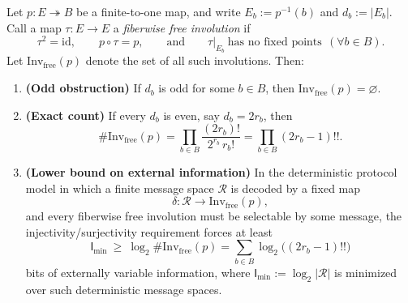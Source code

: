\begin{theorem}\label{thm:fiberwise-free-involution-matching-entropy}
Let \(p:E\twoheadrightarrow B\) be a finite-to-one map, and write \(E_b:=p^{-1}(b)\) and \(d_b:=|E_b|\).
Call a map \(\tau:E\to E\) a \emph{fiberwise free involution} if
\[
\tau^2=\mathrm{id},\qquad p\circ\tau=p,\qquad \text{and}\qquad \tau|_{E_b}\ \text{has no fixed points}\ \ (\forall b\in B).
\]
Let \(\mathrm{Inv}_{\mathrm{free}}(p)\) denote the set of all such involutions.
Then:
\begin{enumerate}
  \item \textbf{(Odd obstruction)} If \(d_b\) is odd for some \(b\in B\), then \(\mathrm{Inv}_{\mathrm{free}}(p)=\varnothing\).
  \item \textbf{(Exact count)} If every \(d_b\) is even, say \(d_b=2r_b\), then
  \[
  \#\mathrm{Inv}_{\mathrm{free}}(p)
  =\prod_{b\in B}\frac{(2r_b)!}{2^{r_b}\,r_b!}
  =\prod_{b\in B}(2r_b-1)!!.
  \]
  \item \textbf{(Lower bound on external information)} In the deterministic protocol model in which a finite message space \(\mathcal R\) is decoded by a fixed map
  \[
  \delta:\mathcal R\longrightarrow \mathrm{Inv}_{\mathrm{free}}(p),
  \]
  and every fiberwise free involution must be selectable by some message, the injectivity/surjectivity requirement forces at least
  \[
  \mathsf I_{\min}\ \ge\ \log_2\#\mathrm{Inv}_{\mathrm{free}}(p)
  =\sum_{b\in B}\log_2\!\bigl((2r_b-1)!!\bigr)
  \]
  bits of externally variable information, where \(\mathsf I_{\min}:=\log_2|\mathcal R|\) is minimized over such deterministic message spaces.
\end{enumerate}
\end{theorem}
